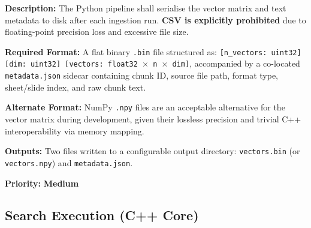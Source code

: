 \documentclass[12pt, a4paper]{article}
\begin{document}
\begin{tcolorbox}[enhanced, colback=white, colframe=ctPurple,
    colbacktitle=ctLightPurple, coltitle=ctPurple, boxrule=0.5pt,
    leftrule=4pt, arc=2mm, fonttitle=\large\bfseries,
    title={FR-4: Interoperability Export},
    drop fuzzy shadow=black!5!white, top=2pt, bottom=2pt]
\begin{prolist}
    \item \textbf{Description:} The Python pipeline shall serialise the
    vector matrix and text metadata to disk after each ingestion run.
    \textbf{CSV is explicitly prohibited} due to floating-point precision
    loss and excessive file size.

    \item \textbf{Required Format:} A flat binary \texttt{.bin} file
    structured as:
    \texttt{[n\_vectors:\,uint32][dim:\,uint32]%
    [vectors:\,float32\,$\times$\,n\,$\times$\,dim]},
    accompanied by a co-located \texttt{metadata.json} sidecar containing
    chunk ID, source file path, format type, sheet/slide index, and raw
    chunk text.

    \item \textbf{Alternate Format:} NumPy \texttt{.npy} files are an
    acceptable alternative for the vector matrix during development, given
    their lossless precision and trivial C++ interoperability via memory
    mapping.

    \item \textbf{Outputs:} Two files written to a configurable output
    directory: \texttt{vectors.bin} (or \texttt{vectors.npy}) and
    \texttt{metadata.json}.

    \item \textbf{Priority:} \textcolor{ctGold}{\textbf{Medium}}
\end{prolist}
\end{tcolorbox}

\vspace{0.5cm}
\subsection{Search Execution (C++ Core)}
\vspace{0.3cm}
\end{document}
